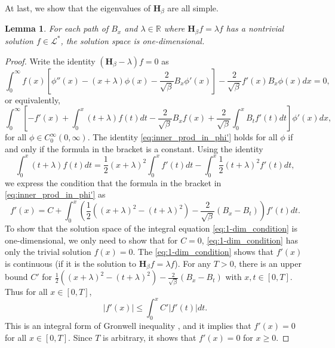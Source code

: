 \documentclass[11pt, a4paper]{article}
\numberwithin{equation}{section}
\newcommand{\realR}{\mathbb{R}}
\newcommand{\Lstar}{\mathcal{L}^*}
\newcommand{\Hbeta}{\mathbf{H}_{\beta}}
\newtheorem{lem}{Lemma}
\theoremstyle{definition}
\theoremstyle{remark}
\begin{document}
At last, we show that the eigenvalues of $\Hbeta$ are all simple.
\begin{lem}
  For each path of $B_x$ and $\lambda \in \realR$ where $\Hbeta f = \lambda f$ has a nontrivial solution $f \in \Lstar$, the solution space is one-dimensional.
\end{lem}
\begin{proof}
  Write the identity $(\Hbeta - \lambda)f = 0$ as
  \begin{equation}
    \int^{\infty}_0 f(x) \left[ \phi''(x) - (x + \lambda) \phi(x) - \frac{2}{\sqrt{\beta}} B_x \phi'(x) \right] - \frac{2}{\sqrt{\beta}} f'(x) B_x \phi(x) dx = 0,
  \end{equation}
  or equivalently,
  \begin{equation} \label{eq:inner_prod_in_phi'}
    \int^{\infty}_0 \left[ -f'(x) + \int^x_0 (t + \lambda)f(t) dt - \frac{2}{\sqrt{\beta}} B_x f(x) + \frac{2}{\sqrt{\beta}} \int^x_0 B_t f'(t) dt \right] \phi'(x) dx,
  \end{equation}
  for all $\phi \in C^{\infty}_0(0, \infty)$. The identity \eqref{eq:inner_prod_in_phi'} holds for all $\phi$ if and only if the formula in the bracket is a constant. Using the identity
  \begin{equation}
    \int^x_0 (t + \lambda) f(t) dt = \frac{1}{2} (x + \lambda)^2 \int^x_0 f'(t) dt - \int^x_0 \frac{1}{2} (t + \lambda)^2 f'(t) dt,
  \end{equation}
  we express the condition that the formula in the bracket in \eqref{eq:inner_prod_in_phi'} as
  \begin{equation} \label{eq:1-dim_condition}
    f'(x) = C + \int^x_0 \left( \frac{1}{2} ((x + \lambda)^2 - (t + \lambda)^2) - \frac{2}{\sqrt{\beta}} (B_x - B_t) \right) f'(t) dt.
  \end{equation}
  To show that the solution space of the integral equation \eqref{eq:1-dim_condition} is one-dimensional, we only need to show that for $C = 0$, \eqref{eq:1-dim_condition} has only the trivial solution $f(x) = 0$. The \eqref{eq:1-dim_condition} shows that $f'(x)$ is continuous (if it is the solution to $\Hbeta f = \lambda f$). For any $T > 0$, there is an upper bound $C'$ for $\frac{1}{2} ((x + \lambda)^2 - (t + \lambda)^2) - \frac{2}{\sqrt{\beta}} (B_x - B_t)$ with $x, t \in [0, T]$. Thus for all $x \in [0, T]$,
  \begin{equation}
    \lvert f'(x) \rvert \leq \int^x_0 C' \lvert f'(t) \rvert dt.
  \end{equation}
  This is an integral form of Gronwell inequality \cite{Bellman53}, and it implies that $f'(x) = 0$ for all $x \in [0, T]$. Since $T$ is arbitrary, it shows that $f'(x) = 0$ for $x \geq 0$. 
\end{proof}
\end{document}
